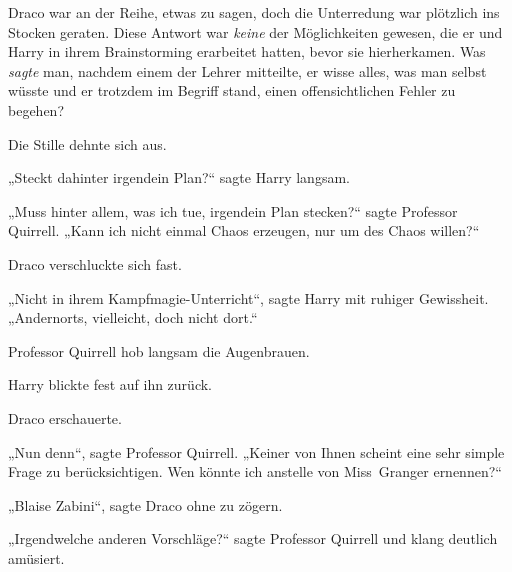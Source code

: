 Draco war an der Reihe, etwas zu sagen, doch die Unterredung war plötzlich ins Stocken geraten. Diese Antwort war \emph{keine} der Möglichkeiten gewesen, die er und Harry in ihrem Brainstorming erarbeitet hatten, bevor sie hierherkamen. Was \emph{sagte} man, nachdem einem der Lehrer mitteilte, er wisse alles, was man selbst wüsste und er trotzdem im Begriff stand, einen offensichtlichen Fehler zu begehen?

Die Stille dehnte sich aus.

„Steckt dahinter irgendein Plan?“ sagte Harry langsam.

„Muss hinter allem, was ich tue, irgendein Plan stecken?“ sagte Professor Quirrell. „Kann ich nicht einmal Chaos erzeugen, nur um des Chaos willen?“

Draco verschluckte sich fast.

„Nicht in ihrem Kampfmagie-Unterricht“, sagte Harry mit ruhiger Gewissheit. „Andernorts, vielleicht, doch nicht dort.“

Professor Quirrell hob langsam die Augenbrauen.

Harry blickte fest auf ihn zurück.

Draco erschauerte.

„Nun denn“, sagte Professor Quirrell. „Keiner von Ihnen scheint eine sehr simple Frage zu berücksichtigen. Wen könnte ich anstelle von Miss~Granger ernennen?“

„Blaise Zabini“, sagte Draco ohne zu zögern.

„Irgendwelche anderen Vorschläge?“ sagte Professor Quirrell und klang deutlich amüsiert.

